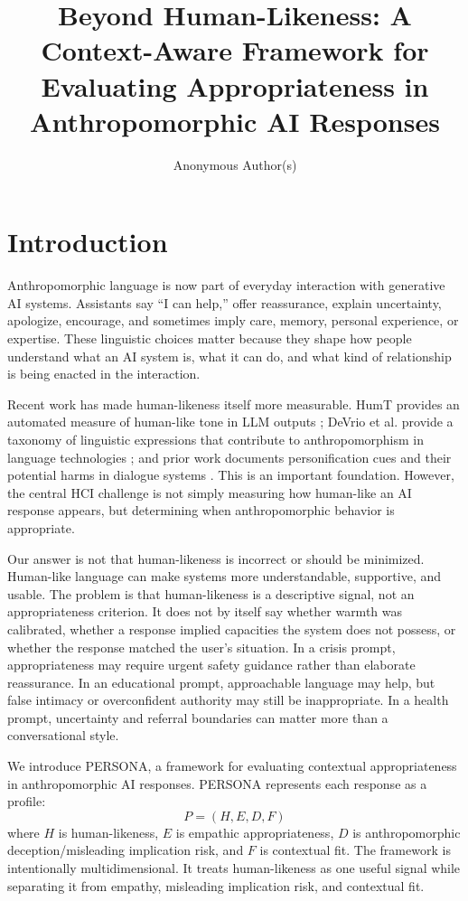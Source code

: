 \documentclass[manuscript,review,anonymous]{acmart}
\title{Beyond Human-Likeness: A Context-Aware Framework for Evaluating Appropriateness in Anthropomorphic AI Responses}
\author{Anonymous Author(s)}
\affiliation{%
  \institution{Anonymous Institution}
  \country{}}
\begin{document}
\maketitle

\section{Introduction}
Anthropomorphic language is now part of everyday interaction with generative AI systems. Assistants say ``I can help,'' offer reassurance, explain uncertainty, apologize, encourage, and sometimes imply care, memory, personal experience, or expertise. These linguistic choices matter because they shape how people understand what an AI system is, what it can do, and what kind of relationship is being enacted in the interaction.

Recent work has made human-likeness itself more measurable. HumT provides an automated measure of human-like tone in LLM outputs \cite{Cheng2025HumT}; DeVrio et al. provide a taxonomy of linguistic expressions that contribute to anthropomorphism in language technologies \cite{DeVrio2025Taxonomy}; and prior work documents personification cues and their potential harms in dialogue systems \cite{Abercrombie2023Mirages}. This is an important foundation. However, the central HCI challenge is not simply measuring how human-like an AI response appears, but determining when anthropomorphic behavior is appropriate.

Our answer is not that human-likeness is incorrect or should be minimized. Human-like language can make systems more understandable, supportive, and usable. The problem is that human-likeness is a descriptive signal, not an appropriateness criterion. It does not by itself say whether warmth was calibrated, whether a response implied capacities the system does not possess, or whether the response matched the user's situation. In a crisis prompt, appropriateness may require urgent safety guidance rather than elaborate reassurance. In an educational prompt, approachable language may help, but false intimacy or overconfident authority may still be inappropriate. In a health prompt, uncertainty and referral boundaries can matter more than a conversational style.

We introduce PERSONA, a framework for evaluating contextual appropriateness in anthropomorphic AI responses. PERSONA represents each response as a profile:
\[
P = (H, E, D, F)
\]
where $H$ is human-likeness, $E$ is empathic appropriateness, $D$ is anthropomorphic deception/misleading implication risk, and $F$ is contextual fit. The framework is intentionally multidimensional. It treats human-likeness as one useful signal while separating it from empathy, misleading implication risk, and contextual fit.
\end{document}
